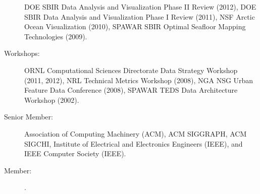 \documentclass[11pt, letterpaper]{article}
\begin{document}
\begin{sloppypar}
\begin{description}
  DOE SBIR Data Analysis and Visualization Phase II Review
  (2012), DOE SBIR Data Analysis and Visualization Phase I Review (2011),
  NSF Arctic Ocean Visualization (2010), SPAWAR SBIR Optimal
  Seafloor Mapping Technologies (2009).
  \item[Workshops:] ORNL Computational Sciences Directorate Data Strategy
  Workshop (2011, 2012), NRL Technical Metrics Workshop (2008), NGA NSG Urban
  Feature Data Conference (2008), SPAWAR TEDS Data Architecture Workshop (2002).
  \item[Senior Member:] Association of Computing Machinery (ACM), ACM SIGGRAPH, ACM SIGCHI, Institute of Electrical and Electronics Engineers (IEEE), and IEEE Computer Society (IEEE).
  \item[Member:] .
\end{description}
\end{sloppypar}
\end{document}
